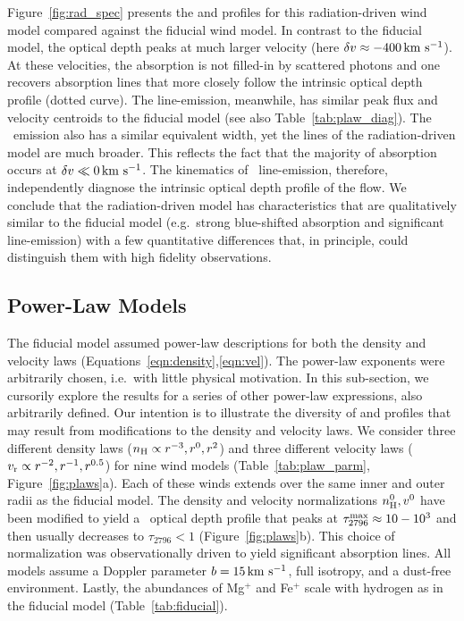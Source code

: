 \documentclass[]{emulateapj}
\begin{document}
Figure~\ref{fig:rad_spec} presents the  and 
profiles for this radiation-driven wind model compared against the
fiducial wind model.
In contrast to the fiducial model, 
the optical depth peaks at much larger velocity (here $\delta v
\approx -400 \, {\rm km~s^{-1}}$).  At these velocities, the absorption is not
filled-in by scattered photons and one recovers absorption lines
that more closely follow the intrinsic optical depth profile (dotted
curve). The  line-emission, meanwhile, has
similar peak flux and velocity centroids to the fiducial model (see also
Table~\ref{tab:plaw_diag}).  The \feiis\ emission also has a similar
equivalent width, yet the lines of the radiation-driven model are much
broader. This reflects the fact that the majority of absorption
occurs at $\delta v \ll 0 \, {\rm km~s^{-1}}$.
The kinematics of \feiis\ line-emission, therefore, independently
diagnose the intrinsic optical depth profile of the flow.
We conclude that the radiation-driven model has characteristics that
are qualitatively similar to the fiducial model (e.g.\ strong
blue-shifted absorption and significant line-emission) with a few
quantitative differences that, in principle, could distinguish them
with high fidelity observations.



\subsection{Power-Law Models}
\label{sec:power}

The fiducial model assumed power-law descriptions for both the density and velocity
laws (Equations~\ref{eqn:density},\ref{eqn:vel}).
The power-law exponents were arbitrarily chosen, i.e.\ with little physical
motivation.  In this sub-section, we cursorily explore the results for a series
of other power-law expressions, also arbitrarily defined.
Our intention is to illustrate the diversity of  and
 profiles that may result from modifications to the density
and velocity laws.
We consider three different density laws ($n_{\rm H} \propto
r^{-3}, r^{0}, r^2$) and three different velocity laws ($v_{\rm r}
\propto r^{-2}, r^{-1}, r^{0.5}$) for nine wind models
(Table~\ref{tab:plaw_parm}, Figure~\ref{fig:plaws}a).  
Each of these winds extends over the same inner and outer radii as the
fiducial model.
The density and velocity normalizations $n_{\rm H}^0, v^0$ have been
modified to yield a \mgiia\ optical depth profile that peaks at
$\tau_{2796}^{\rm max} \approx 10-10^3$ and then usually decreases to
$\tau_{2796} < 1$ (Figure~\ref{fig:plaws}b). 
This choice of normalization was observationally driven to yield
significant absorption lines.
All models assume a Doppler parameter
$b=15\, {\rm km~s^{-1}}$, full isotropy, and a dust-free environment.
Lastly, the abundances of Mg$^+$ and Fe$^+$ scale with hydrogen as
in the fiducial model (Table~\ref{tab:fiducial}).
\end{document}
